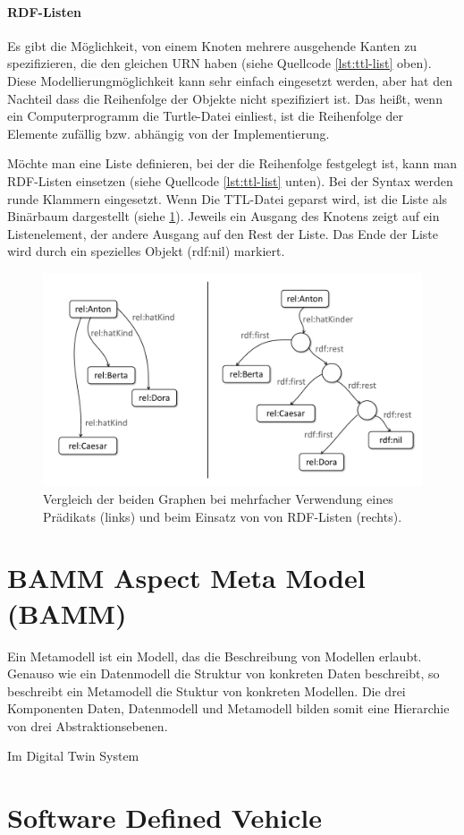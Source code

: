 \paragraph{RDF-Listen}
Es gibt die Möglichkeit, von einem Knoten mehrere ausgehende Kanten zu spezifizieren, die den gleichen URN haben (siehe Quellcode \ref{lst:ttl-list} oben). Diese Modellierungmöglichkeit kann sehr einfach eingesetzt werden, aber hat den Nachteil dass die Reihenfolge der Objekte nicht spezifiziert ist. Das heißt, wenn ein Computerprogramm  die Turtle-Datei einliest, ist die Reihenfolge der Elemente zufällig bzw. abhängig von der Implementierung.

Möchte man eine Liste definieren, bei der die Reihenfolge festgelegt ist, kann man RDF-Listen einsetzen (siehe Quellcode \ref{lst:ttl-list} unten). Bei der Syntax werden runde Klammern eingesetzt. Wenn Die TTL-Datei geparst wird, ist die Liste als Binärbaum dargestellt (siehe \ref{fig:rdflist}). Jeweils ein Ausgang des Knotens zeigt auf ein Listenelement, der andere Ausgang auf den Rest der Liste. Das Ende der Liste wird durch ein spezielles Objekt (rdf:nil) markiert.

\begin{figure}
	\centering
	\includegraphics[width=0.7\linewidth]{resources/figures/rdfList}
	\caption[Vergleich von Merhfachverwendung eines Prädikats und RDF-Listen]{Vergleich der beiden Graphen bei mehrfacher Verwendung eines Prädikats (links) und beim Einsatz von von RDF-Listen (rechts).}
	\label{fig:rdflist}
\end{figure}



\section{BAMM Aspect Meta Model (BAMM)}

Ein Metamodell ist ein Modell, das die Beschreibung von Modellen erlaubt. \cite[vgl.][S. 43f]{jeusfeld2009metamodel} Genauso wie ein Datenmodell die Struktur von konkreten Daten beschreibt, so beschreibt ein Metamodell die Stuktur von konkreten Modellen. Die drei Komponenten Daten, Datenmodell und Metamodell bilden somit eine Hierarchie von drei Abstraktionsebenen.

Im Digital Twin System 





\section{Software Defined Vehicle}


